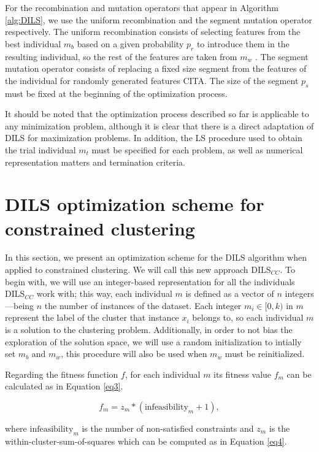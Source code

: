 \documentclass[review]{elsarticle}
\begin{document}
For the recombination and mutation operators that appear in Algorithm \ref{alg:DILS}, we use the uniform recombination and the segment mutation operator respectively. The uniform recombination consists of selecting features from the best individual $m_b$ based on a given probability $p_r$ to introduce them in the resulting individual, so the rest of the features are taken from $m_w$ \cite{spears1995virtues}. The segment mutation operator consists of replacing a fixed size segment from the features of the individual for randomly generated features CITA. The size of the segment $p_s$ must be fixed at the beginning of the optimization process.

It should be noted that the optimization process described so far is applicable to any minimization problem, although it is clear that there is a direct adaptation of DILS for maximization problems. In addition, the LS procedure used to obtain the trial individual $m_t$ must be specified for each problem, as well as numerical representation matters and termination criteria.

\section{DILS optimization scheme for constrained clustering} \label{sec:DILS_CC}

In this section, we present an optimization scheme for the DILS algorithm when applied to constrained clustering. We will call this new approach DILS$_{CC}$. To begin with, we will use an integer-based representation for all the individuals DILS$_{CC}$ work with; this way, each individual $m$ is defined as a vector of $n$ integers---being $n$ the number of instances of the dataset. Each integer $m_i \in [0,k)$ in $m$ represent the label of the cluster that instance $x_i$ belongs to, so each individual $m$ is a solution to the clustering problem. Additionally, in order to not bias the exploration of the solution space, we will use a random initialization to intially set $m_b$ and $m_w$, this procedure will also be used when $m_w$ must be reinitialized.

Regarding the fitness function $f$, for each individual $m$ its fitness value $f_m$ can be calculated as in Equation \ref{eq3}.

\begin{equation}
f_m = z_m * (\text{infeasibility}_m + 1),
\label{eq3}
\end{equation}

\noindent where $\text{infeasibility}_m$ is the number of non-satisfied constraints and $z_m$ is the within-cluster-sum-of-squares which can be computed as in Equation \eqref{eq4}.
\end{document}
